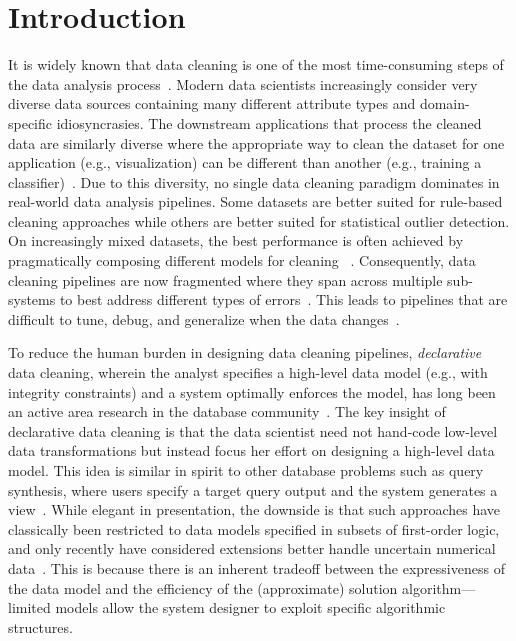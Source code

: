 \section{Introduction}\label{intro}\sloppy
It is widely known that data cleaning is one of the most time-consuming steps of the data analysis process~\cite{nytimes}.
Modern data scientists increasingly consider very diverse data sources containing many different attribute types and domain-specific idiosyncrasies.
The downstream applications that process the cleaned data are similarly diverse where the appropriate way to clean the dataset for one application (e.g., visualization) can be different than another (e.g., training a classifier)~\cite{DBLP:journals/pvldb/KrishnanWWFG16}.
Due to this diversity, no single data cleaning paradigm dominates in real-world data analysis pipelines.
Some datasets are better suited for rule-based cleaning approaches while others are better suited for statistical outlier detection.
On increasingly mixed datasets, the best performance is often achieved by pragmatically composing different models for cleaning ~\cite{DBLP:journals/pvldb/AbedjanCDFIOPST16}.
Consequently, data cleaning pipelines are now fragmented where they span across multiple sub-systems to best address different types of errors~\cite{krishnan2016hilda}.
This leads to pipelines that are difficult to tune, debug, and generalize when the data changes~\cite{sculley2014machine,krishnan2016hilda}.

To reduce the human burden in designing data cleaning pipelines, \emph{declarative} data cleaning, wherein the analyst specifies a high-level data model (e.g., with integrity constraints) and a system optimally enforces the model, has long been an active area research in the database community~\cite{DBLP:conf/sigmod/ChuIKW16}.
The key insight of declarative data cleaning is that the data scientist need not hand-code low-level data transformations but instead focus her effort on designing a high-level data model.
This idea is similar in spirit to other database problems such as query synthesis, where users specify a target query output and the system generates a view~\cite{cheung2013optimizing}.
While elegant in presentation, the downside is that such approaches have classically been restricted to data models specified in subsets of first-order logic, and only recently have considered extensions better handle uncertain numerical data~\cite{prokoshyna2015combining}.
This is because there is an inherent tradeoff between the expressiveness of the data model and the efficiency of the (approximate) solution algorithm---limited models allow the system designer to exploit specific algorithmic structures.

